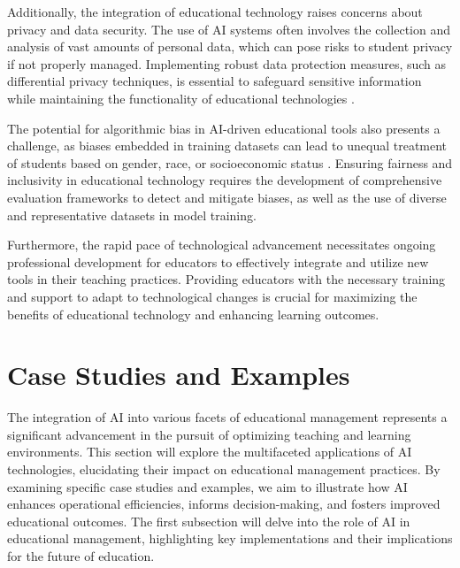 Additionally, the integration of educational technology raises concerns about privacy and data security. The use of AI systems often involves the collection and analysis of vast amounts of personal data, which can pose risks to student privacy if not properly managed. Implementing robust data protection measures, such as differential privacy techniques, is essential to safeguard sensitive information while maintaining the functionality of educational technologies \cite{sen2018supervisingfeatureinfluence}.



The potential for algorithmic bias in AI-driven educational tools also presents a challenge, as biases embedded in training datasets can lead to unequal treatment of students based on gender, race, or socioeconomic status \cite{kasneci2023chatgpt}. Ensuring fairness and inclusivity in educational technology requires the development of comprehensive evaluation frameworks to detect and mitigate biases, as well as the use of diverse and representative datasets in model training.



Furthermore, the rapid pace of technological advancement necessitates ongoing professional development for educators to effectively integrate and utilize new tools in their teaching practices. Providing educators with the necessary training and support to adapt to technological changes is crucial for maximizing the benefits of educational technology and enhancing learning outcomes.














\section{Case Studies and Examples} \label{sec:Case Studies and Examples}

 

The integration of AI into various facets of educational management represents a significant advancement in the pursuit of optimizing teaching and learning environments. This section will explore the multifaceted applications of AI technologies, elucidating their impact on educational management practices. By examining specific case studies and examples, we aim to illustrate how AI enhances operational efficiencies, informs decision-making, and fosters improved educational outcomes. The first subsection will delve into the role of AI in educational management, highlighting key implementations and their implications for the future of education.








